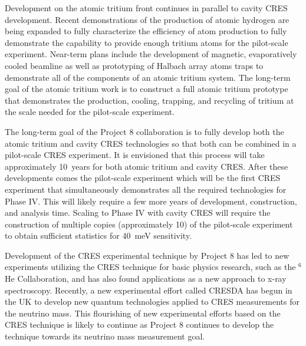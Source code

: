 Development on the atomic tritium front continues in parallel to cavity CRES development. Recent demonstrations of the production of atomic hydrogen are being expanded to fully characterize the efficiency of atom production to fully demonstrate the capability to provide enough tritium atoms for the pilot-scale experiment. Near-term plans include the development of magnetic, evaporatively cooled beamline as well as prototyping of Halbach array atoms traps to demonstrate all of the components of an atomic tritium system. The long-term goal of the atomic tritium work is to construct a full atomic tritium prototype that demonstrates the production, cooling, trapping, and recycling of tritium at the scale needed for the pilot-scale experiment.

The long-term goal of the Project 8 collaboration is to fully develop both the atomic tritium and cavity CRES technologies so that both can be combined in a pilot-scale CRES experiment. It is envisioned that this process will take approximately 10~years for both atomic tritium and cavity CRES. After these developments comes the pilot-scale experiment which will be the first CRES experiment that simultaneously demonstrates all the required technologies for Phase IV. This will likely require a few more years of development, construction, and analysis time. Scaling to Phase IV with cavity CRES will require the construction of multiple copies (approximately 10) of the pilot-scale experiment to obtain sufficient statistics for 40~meV sensitivity.

Development of the CRES experimental technique by Project 8 has led to new experiments utilizing the CRES technique for basic physics research, such as the $^6$He Collaboration, and has also found applications as a new approach to x-ray spectroscopy. Recently, a new experimental effort called CRESDA has begun in the UK to develop new quantum technologies applied to CRES measurements for the neutrino mass. This flourishing of new experimental efforts based on the CRES technique is likely to continue as Project 8 continues to develop the technique towards its neutrino mass measurement goal.

